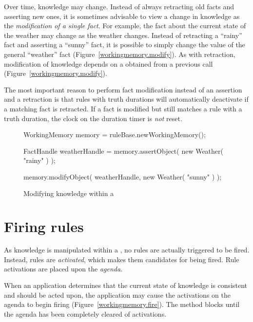 Over time, knowledge may change.  Instead of always retracting old
facts and asserting new ones, it is sometimes advisable to view a
change in knowledge as the \emph{modification of a single fact}.
For example, the fact about the current state of the weather may
change as the weather changes.  Instead of retracting a ``rainy'' fact
and asserting a ``sunny'' fact, it is possible to simply change the
value of the general ``weather'' fact
(Figure~\vref{workingmemory.modify}).  As with retraction,
modification of knowledge depends on a 
obtained from a previous
 call
(Figure~\vref{workingmemory.modify}).

The most important reason to perform fact modification instead of an
assertion and a retraction is that rules with truth durations will
automatically deactivate if a matching fact is retracted.  If a fact
is modified but still matches a rule with a truth duration, the clock
on the duration timer is \emph{not} reset.

\begin{figure}
\begin{javaCodelisting}
WorkingMemory memory = ruleBase.newWorkingMemory();

FactHandle weatherHandle = memory.assertObject( new Weather( "rainy" ) );

memory.modifyObject( weatherHandle,
                     new Weather( "sunny" ) );
\end{javaCodelisting}
\caption{Modifying knowledge within a }
\label{workingmemory.modify}
\end{figure}

\section{Firing rules}

As knowledge is manipulated within a , 
no rules are actually triggered to be fired.  Instead, rules are
\emph{activated}, which makes them
candidates for being fired.  Rule activations are placed upon
the \emph{agenda}.

When an application determines that the current state of knowledge
is consistent and should be acted upon, the application may cause
the activations on the agenda to begin firing
(Figure~\vref{workingmemory.fire}).  The
method blocks until the agenda has been completely cleared of
activations.  

